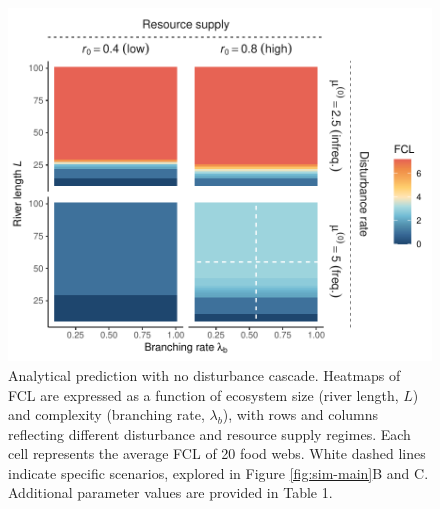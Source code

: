 \newpage

\begin{figure}
\centering
\includegraphics{../data_fmt/fig_rho0.pdf}
\caption{Analytical prediction with no disturbance cascade. Heatmaps of
FCL are expressed as a function of ecosystem size (river length, \(L\))
and complexity (branching rate, \(\lambda_b\)), with rows and columns
reflecting different disturbance and resource supply regimes. Each cell
represents the average FCL of 20 food webs. White dashed lines indicate
specific scenarios, explored in Figure \ref{fig:sim-main}B and C.
Additional parameter values are provided in Table 1.}
\end{figure}

\newpage

